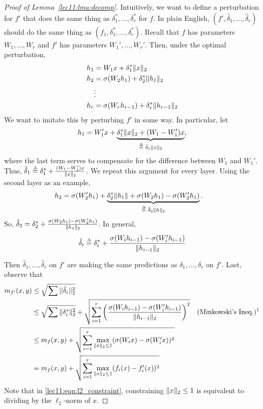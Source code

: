 \begin{proof}[Proof of Lemma~\ref{lec11:lma:decomp}]
Intuitively, we want to define a perturbation for $f'$ that does the same thing as $\delta_1^*,\dots,\delta_r^*$ for $f$. In plain English, $(f', \hat{\delta}_1, \dots, \hat{\delta}_r)$ should do the same thing as $(f_1, \delta_1^*, \dots, \delta_r^*)$. Recall that $f$ has parameters $W_1, \dots, W_r$ and $f'$ has parameters $W_1', \dots, W_r'$. Then, under the optimal perturbation,
\begin{align}
    h_1 &= W_1 x + \delta_1^* \|x\|_2 \\
    h_2 &= \sigma(W_2 h_1) + \delta_2^* \|h_1\|_2 \\
    &\vdots \nonumber \\
    h_r &= \sigma(W_r h_{r - 1}) + \delta_r^* \|h_{r - 1}\|_2
\end{align}
We want to imitate this by perturbing $f'$ in some way. In particular, let
\begin{equation}
    h_1 = W_1'x + \underbrace{\delta_1^* \norm{x}_2 + (W_1 - W_1')x}_{\defeq \text{ }\hat{\delta}_1 \norm{x}_2},
\end{equation}
where the last term serves to compensate for the difference between $W_1$ and $W_1'$. Thus, $\hat{\delta}_1 \defeq \delta_1^* + \frac{(W_1 - W_1')x}{\norm{x}_2}$.
We repeat this argument for every layer. Using the second layer as an example, 
\begin{align}
    h_2 &= \sigma(W_2' h_1) + \underbrace{\delta_2^*\norm{h_1} + \sigma(W_2 h_1) - \sigma(W_2' h_1)}_{\defeq \text{ }\hat{\delta}_2 \norm{h}_2}.
\end{align}
So, $\hat{\delta}_2 = \delta_2^* + \frac{\sigma(W_2 h_1) - \sigma(W_2' h_1)}{\|h_1\|_2}$. In general, 
\begin{align}
    \hat{\delta}_i \defeq \delta_i^* + \frac{\sigma(W_ih_{i-1}) - \sigma(W_i' h_{i-1})}{\norm{h_{i-1}}_2}
\end{align} 

Then $\hat{\delta}_1,\dots, \hat{\delta}_r$ on $f'$ are making the same predictions as $\delta_1, \dots, \delta_r$ on $f'$. Last, observe that
\begin{align}
    m_{f'}(x, y) &\leq \sqrt{\sum ||\hat{\delta}_i||_2^2} \\
    &\leq \sqrt{\sum \norm{\delta_i^*}_2^2} + \sqrt{\sum_{i = 1}^r \left (\frac{\sigma(W_i h_{i-1}) - \sigma(W_i' h_{i-1})}{\norm{h_{i-1}}_2} \right)^2 } &\text{(Minkowski's Ineq.)\footnotemark}\\
    &\leq m_f(x, y) + \sqrt{\sum_{i=1}^r \max_{\norm{x}_2 \leq 1} (\sigma(W_i x)-\sigma(W'_i x))^2} \label{lec11:eqn:l2_constraint} \\
    &= m_f(x, y) + \sqrt{\sum_{i=1}^r \max_{\norm{x}_2 \leq 1} (f_i(x)-f_i'(x))^2}
\end{align} 
Note that in \eqref{lec11:eqn:l2_constraint}, constraining $\|x\|_2 \leq 1$ is equivalent to dividing by the $\ell_2$-norm of $x$.
\end{proof}

